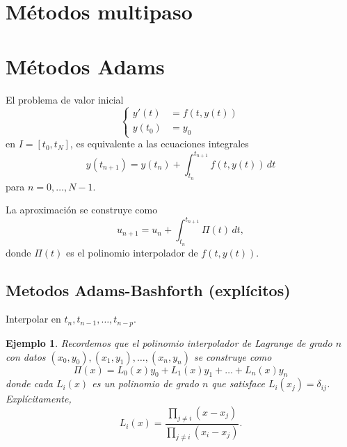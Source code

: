 \documentclass[11pt,letterpaper]{report}
\newtheorem{example}{Ejemplo}
\begin{document}
\section{Métodos multipaso}

\section{Métodos Adams}

El problema de valor inicial
\begin{equation}
  \left\{
    \begin{aligned}
      y'(t) &= f(t,y(t)) \\
      y(t_0) &= y_0
    \end{aligned}
  \right.
\end{equation}
en $I=[t_0,t_N]$, es equivalente a las ecuaciones integrales
\begin{equation}
  y(t_{n+1}) = y(t_n) + \int_{t_n}^{t_{n+1}}\! f(t,y(t))\,dt
\end{equation}
para $n=0,\dots,N-1$.

La aproximación se construye como
\begin{equation}
  u_{n+1} = u_n + \int_{t_n}^{t_{n+1}}\Pi(t)\,dt,
\end{equation}
donde $\Pi(t)$ es el polinomio interpolador de $f(t,y(t))$.


\subsection{Metodos Adams-Bashforth (explícitos)}
Interpolar en $t_{n},t_{n-1},\dots,t_{n-p}$.

\begin{example}
  Recordemos que el polinomio interpolador de Lagrange de grado $n$ 
  con datos $(x_0,y_0),(x_1,y_1),\dots,(x_n,y_n)$ se construye como
  \begin{equation}
    \Pi(x) =  L_0(x)y_0 + L_1(x)y_1 + \dots + L_n(x)y_n
  \end{equation}
  donde cada $L_i(x)$ es un polinomio de grado $n$ que satisface
  $L_i(x_j)=\delta_{ij}$. Explícitamente,
  \begin{equation}
    L_i(x) = \frac{\prod_{j\neq i}(x-x_j)}{\prod_{j\neq i}(x_i-x_j)}
  .\end{equation}
\end{example}
\end{document}
